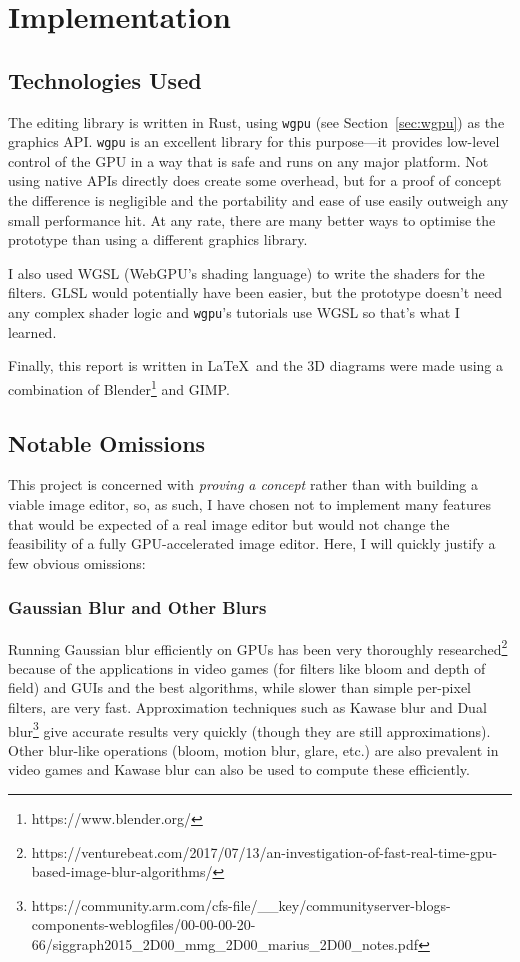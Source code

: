 \documentclass[12pt]{article}
\begin{document}
\section{Implementation}

\subsection{Technologies Used}

The editing library is written in Rust, using \verb|wgpu| (see Section~\ref{sec:wgpu}) as the
graphics API\@.  \verb|wgpu| is an excellent library for this purpose---it provides low-level
control of the GPU in a way that is safe and runs on any major platform.  Not using native APIs
directly does create some overhead, but for a proof of concept the difference is negligible and the
portability and ease of use easily outweigh any small performance hit.  At any rate, there are many
better ways to optimise the prototype than using a different graphics library.

I also used WGSL (WebGPU's shading language) to write the shaders for the filters.  GLSL would
potentially have been easier, but the prototype doesn't need any complex shader logic and
\verb|wgpu|'s tutorials use WGSL so that's what I learned.

Finally, this report is written in \LaTeX\ and the 3D diagrams were made using a combination of
Blender\footnote{https://www.blender.org/} and GIMP.

\subsection{Notable Omissions}

This project is concerned with \emph{proving a concept} rather than with building a viable image
editor, so, as such, I have chosen not to implement many features that would be expected of a real
image editor but would not change the feasibility of a fully GPU-accelerated image editor.  Here, I
will quickly justify a few obvious omissions:

\subsubsection{Gaussian Blur and Other Blurs}

Running Gaussian blur efficiently on GPUs has been very thoroughly
researched\footnote{https://venturebeat.com/2017/07/13/an-investigation-of-fast-real-time-gpu-based-image-blur-algorithms/}
because of the applications in video games (for filters like bloom and depth of field) and GUIs and
the best algorithms, while slower than simple per-pixel filters, are very fast.  Approximation
techniques such as Kawase blur and Dual
blur\footnote{https://community.arm.com/cfs-file/\_\_key/communityserver-blogs-components-weblogfiles/00-00-00-20-66/siggraph2015\_2D00\_mmg\_2D00\_marius\_2D00\_notes.pdf}
give accurate results very quickly (though they are still approximations).  Other blur-like
operations (bloom, motion blur, glare, etc.) are also prevalent in video games and Kawase blur can
also be used to compute these efficiently.
\end{document}
